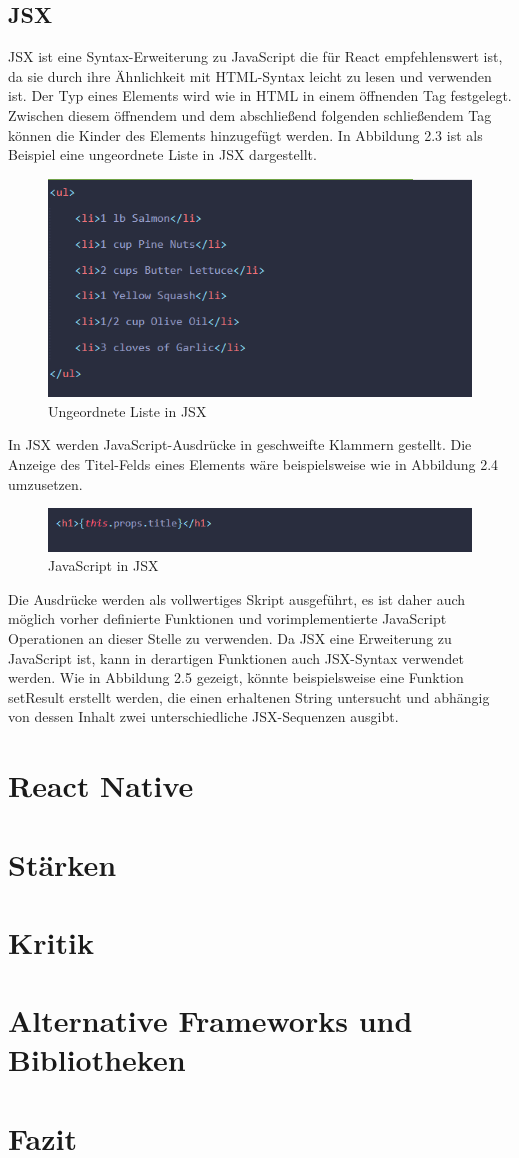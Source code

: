 \subsection{JSX}
JSX ist eine Syntax-Erweiterung zu JavaScript die für React empfehlenswert ist, da sie durch ihre Ähnlichkeit mit HTML-Syntax leicht zu lesen und verwenden ist. Der Typ eines Elements wird wie in HTML in einem öffnenden Tag festgelegt. Zwischen diesem öffnendem und dem abschließend folgenden schließendem Tag können die Kinder des Elements hinzugefügt werden. In Abbildung 2.3 ist als Beispiel eine ungeordnete Liste in JSX dargestellt.
\begin{figure}[!thb]
     \centerline{\includegraphics[width=12cm]{../Abbildungen/jsxList.png}}
  \caption{Ungeordnete Liste in JSX}
  \label{Ungeordnete Liste in JSX}
\end{figure}
In JSX werden JavaScript-Ausdrücke in geschweifte Klammern gestellt. Die Anzeige des Titel-Felds eines Elements wäre beispielsweise wie in Abbildung 2.4 umzusetzen.\\ 
\begin{figure}[!thb]
     \centerline{\includegraphics[width=12cm]{../Abbildungen/jsxExpression.png}}
  \caption{JavaScript in JSX}
  \label{JavaScript in JSX}
\end{figure}
Die Ausdrücke werden als vollwertiges Skript ausgeführt, es ist daher auch möglich vorher definierte Funktionen und vorimplementierte JavaScript Operationen an dieser Stelle zu verwenden. Da JSX eine Erweiterung zu JavaScript ist, kann in derartigen Funktionen auch JSX-Syntax verwendet werden. Wie in Abbildung 2.5 gezeigt, könnte beispielsweise eine Funktion setResult erstellt werden, die einen erhaltenen String untersucht und abhängig von dessen Inhalt zwei unterschiedliche JSX-Sequenzen ausgibt. \\
\section{React Native}
\section{Stärken}
\section{Kritik}
\section{Alternative Frameworks und Bibliotheken}
\section{Fazit}

